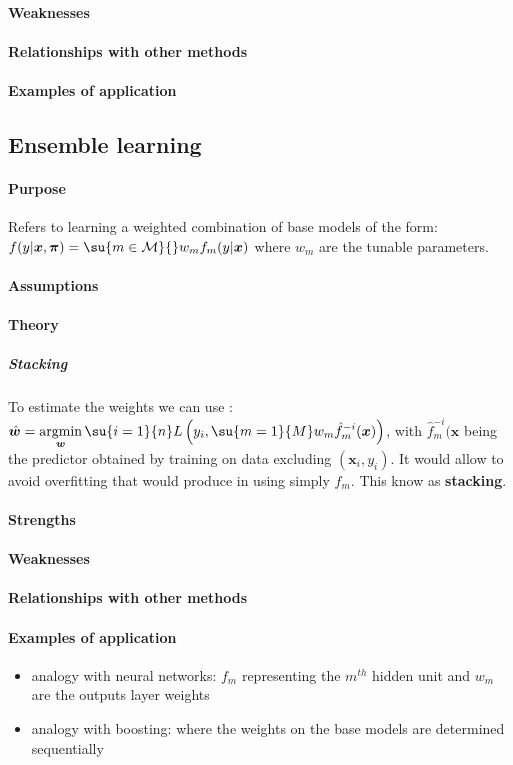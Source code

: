 \paragraph{Weaknesses}
\paragraph{Relationships with other methods}
\paragraph{Examples of application}

\subsection{Ensemble learning}
\paragraph{Purpose}
Refers to learning a weighted combination of base models of the form:
$f(y|\bm{x},\bm{\pi}) = \su{m\in\mathcal{M}}{}w_{m}f_{m}(y|\bm{x})$ where $w_{m}$ are
the tunable parameters.
\paragraph{Assumptions}
\paragraph{Theory}
\subparagraph{Stacking}
To estimate the weights we can use : $\hat{\bm{w}} = \displaystyle\argmin_{\bm{
w}}\su{i=1}{n}L\left(y_{i},\su{m=1}{M}w_{m}\hat{f}_{m}^{-i}(\bm{x})\right)$, with 
$\hat{f}_{m}^{-i}(\bm{x}$ being the predictor obtained by training on data excluding
$(\bm{x}_{i},y_{i})$. It would allow to avoid overfitting that would produce in using
simply $f_{m}$. This know as \textbf{stacking}.
\paragraph{Strengths}
\paragraph{Weaknesses}
\paragraph{Relationships with other methods}
\paragraph{Examples of application}
\begin{itemize}
    \item analogy with neural networks: $f_{m}$ representing the $m^{th}$ hidden unit 
        and $w_{m}$ are the outputs layer weights
    \item analogy with boosting: where the weights on the base models are determined 
        sequentially
\end{itemize}


